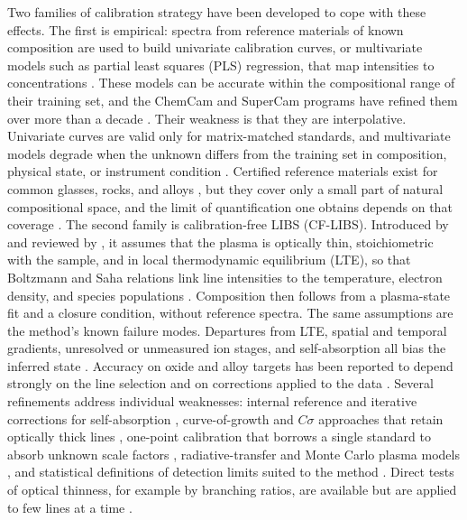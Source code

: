 Two families of calibration strategy have been developed to cope with these effects.
The first is empirical: spectra from reference materials of known composition are used to build univariate calibration curves, or multivariate models such as partial least squares (PLS) regression, that map intensities to concentrations \citep{clegg2009pls,dyar2016univariate,costa2021calibration}.
These models can be accurate within the compositional range of their training set, and the ChemCam and SuperCam programs have refined them over more than a decade \citep{wiens2012chemcam,anderson2017submodels,wiens2021supercam,anderson2022supercam}.
Their weakness is that they are interpolative.
Univariate curves are valid only for matrix-matched standards, and multivariate models degrade when the unknown differs from the training set in composition, physical state, or instrument condition \citep{dyar2016univariate,eppler1996matrix}.
Certified reference materials exist for common glasses, rocks, and alloys \citep{jochum2005georem,jochum2011nist}, but they cover only a small part of natural compositional space, and the limit of quantification one obtains depends on that coverage \citep{mermet2008loq}.
The second family is calibration-free LIBS (CF-LIBS).
Introduced by \citet{ciucci1999cflibs} and reviewed by \citet{tognoni2010cflibs}, it assumes that the plasma is optically thin, stoichiometric with the sample, and in local thermodynamic equilibrium (LTE), so that Boltzmann and Saha relations link line intensities to the temperature, electron density, and species populations \citep{cristoforetti2010lte,aguilera2007multielement}.
Composition then follows from a plasma-state fit and a closure condition, without reference spectra.
The same assumptions are the method's known failure modes.
Departures from LTE, spatial and temporal gradients, unresolved or unmeasured ion stages, and self-absorption all bias the inferred state \citep{cristoforetti2010lte,cristoforetti2013columnar,aguilera2004spatial}.
Accuracy on oxide and alloy targets has been reported to depend strongly on the line selection and on corrections applied to the data \citep{praher2010cflibs,herrera2009cflibs}.
Several refinements address individual weaknesses: internal reference and iterative corrections for self-absorption \citep{bulajic2002selfabsorption}, curve-of-growth and $C\sigma$ approaches that retain optically thick lines \citep{aragon2014csigma,aragon2015generalizedcog}, one-point calibration that borrows a single standard to absorb unknown scale factors \citep{cavalcanti2013onepoint}, radiative-transfer and Monte Carlo plasma models \citep{gornushkin2022montecarlo}, and statistical definitions of detection limits suited to the method \citep{villasboas2023lod}.
Direct tests of optical thinness, for example by branching ratios, are available but are applied to few lines at a time \citep{urbinamedina2021branching}.

